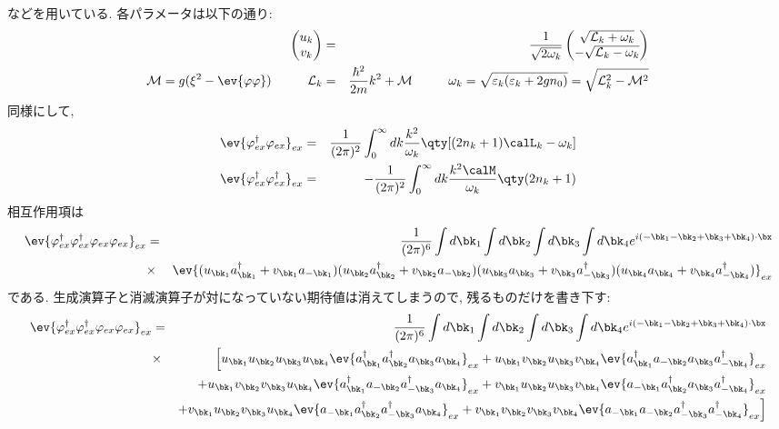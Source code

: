 \documentclass[10.5pt,a4paper]{jreport}
\begin{document}
などを用いている. 各パラメータは以下の通り:
\begin{eqnarray}
  \begin{pmatrix}
    u_k\\
    v_k
  \end{pmatrix}
  &=& \frac{1}{\sqrt{2\omega_k}}
  \begin{pmatrix}
    \sqrt{{\cal L}_k + \omega_k}\\
    -\sqrt{{\cal L}_k - \omega_k}
  \end{pmatrix}\\
               {\cal M} = g(\xi^2 - \ev{\varphi\varphi})\hspace{1cm}{\cal L}_k &=& \frac{\hbar^2}{2m}k^2 + {\cal M}\hspace{1cm}\omega_k = \sqrt{\varepsilon_k(\varepsilon_k + 2gn_0)}= \sqrt{{\cal L}^2_k - {\cal M}^2}
\end{eqnarray}
同様にして, 
\begin{eqnarray}
  \ev{\varphi_{ex}^\dagger\varphi_{ex}}_{ex} &=& \frac{1}{(2\pi)^2}\int_0^\infty dk\frac{k^2}{\omega_k}\qty[(2n_k + 1)\calL_k - \omega_k]\\
  \ev{\varphi_{ex}^\dagger\varphi^\dagger_{ex}}_{ex} &=& -\frac{1}{(2\pi)^2}\int_0^\infty dk\frac{k^2\calM}{\omega_k}\qty(2n_k + 1)
\end{eqnarray}
相互作用項は
\begin{eqnarray}
  \nonumber  \ev{\varphi_{ex}^\dagger\varphi_{ex}^\dagger\varphi_{ex}\varphi_{ex}}_{ex} &=& \frac{1}{(2\pi)^6}\int d\bk_1\int d\bk_2\int d\bk_3\int d\bk_4 e^{i(-\bk_1-\bk_2+\bk_3+\bk_4)\cdot \bx}\\
  \nonumber  &\times& \ev{(u_{\bk_1} a_{\bk_1}^\dagger + v_{\bk_1}a_{-\bk_1})(u_{\bk_2} a_{\bk_2}^\dagger + v_{\bk_2}a_{-\bk_2})(u_{\bk_3} a_{\bk_3} + v_{\bk_3}a_{-\bk_3}^\dagger)(u_{\bk_4} a_{\bk_4} + v_{\bk_4}a_{-\bk_4}^\dagger)}_{ex}\\
\end{eqnarray}
である. 生成演算子と消滅演算子が対になっていない期待値は消えてしまうので, 残るものだけを書き下す:
\begin{eqnarray}
  \nonumber  \ev{\varphi_{ex}^\dagger\varphi_{ex}^\dagger\varphi_{ex}\varphi_{ex}}_{ex} &=& \frac{1}{(2\pi)^6}\int d\bk_1\int d\bk_2\int d\bk_3\int d\bk_4 e^{i(-\bk_1-\bk_2+\bk_3+\bk_4)\cdot \bx}\\
  \nonumber  &\times& \Bigl[u_{\bk_1}u_{\bk_2}u_{\bk_3}u_{\bk_4}\ev{a^\dagger_{\bk_1}a^\dagger_{\bk_2}a_{\bk_3}a_{\bk_4}}_{ex} + u_{\bk_1}v_{\bk_2}u_{\bk_3}v_{\bk_4}\ev{a^\dagger_{\bk_1}a_{-\bk_2}a_{\bk_3}a^\dagger_{-\bk_4}}_{ex}\\
    \nonumber    &&+ u_{\bk_1}v_{\bk_2}v_{\bk_3}u_{\bk_4}\ev{a^\dagger_{\bk_1}a_{-\bk_2}a^\dagger_{-\bk_3}a_{\bk_4}}_{ex} + v_{\bk_1}u_{\bk_2}u_{\bk_3}v_{\bk_4}\ev{a_{-\bk_1}a^\dagger_{\bk_2}a_{\bk_3}a^\dagger_{-\bk_4}}_{ex}\\
    \nonumber    &&+ v_{\bk_1}u_{\bk_2}v_{\bk_3}u_{\bk_4}\ev{a_{-\bk_1}a^\dagger_{\bk_2}a^\dagger_{-\bk_3}a_{\bk_4}}_{ex} + v_{\bk_1}v_{\bk_2}v_{\bk_3}v_{\bk_4}\ev{a_{-\bk_1}a_{-\bk_2}a^\dagger_{-\bk_3}a^\dagger_{-\bk_4}}_{ex}\Bigr]\\\label{interaction-expectation}
\end{eqnarray}
\end{document}
